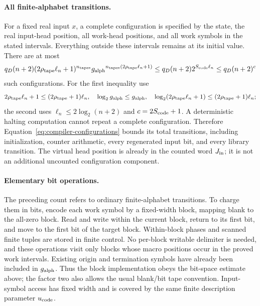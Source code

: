 \paragraph{All finite-alphabet transitions.}
For a fixed real input $x$, a complete configuration is specified by
the state, the real input-head position, all work-head positions, and
all work symbols in the stated intervals.  Everything outside these
intervals remains at its initial value.  There are at most
\begin{equation}\label{eq:compiler-configurations}
 q_D(n+2)(2\rho_{\rm tape} \ell_n+1)^{n_{\rm tapes}}
       {g_{\rm alph}}^{{n_{\rm tapes}}(2\rho_{\rm tape} \ell_n+1)}
 \le q_D(n+2)2^{S_{\rm code}\ell_n}
 \le q_D(n+2)^c
\end{equation}
such configurations.  For the first inequality use
\[
 2\rho_{\rm tape} \ell_n+1\le(2\rho_{\rm tape}+1)\ell_n,
 \quad \log_2{g_{\rm alph}}\le {g_{\rm alph}},
 \quad \log_2(2\rho_{\rm tape} \ell_n+1)\le(2\rho_{\rm tape}+1)\ell_n;
\]
the second uses $\ell_n\le2\log_2(n+2)$ and $c=2{S_{\rm code}}+1$.
A deterministic halting computation cannot repeat a complete
configuration.  Therefore Equation~\eqref{eq:compiler-configurations}
bounds its total transitions, including initialization, counter
arithmetic, every regenerated input bit, and every library transition.
The virtual head position is already in the counted word ${J_{\rm in}}$; it is
not an additional uncounted configuration component.

\paragraph{Elementary bit operations.}
The preceding count refers to ordinary finite-alphabet transitions.
To charge them in bits, encode each work symbol by a fixed-width block,
mapping blank to the all-zero block.  Read and write within the current
block, return to its first bit, and move to the first bit of the target
block.  Within-block phases and scanned finite tuples are stored in
finite control.  No per-block writable delimiter is needed, and these
operations visit only blocks whose macro positions occur in the proved
work intervals.  Existing origin and termination symbols have already
been included in ${g_{\rm alph}}$.  Thus the block implementation obeys the bit-space
estimate above; the factor two also allows the usual blank/bit tape
convention.  Input-symbol access has fixed width and is covered by the
same finite description parameter ${u_{\rm code}}$.

